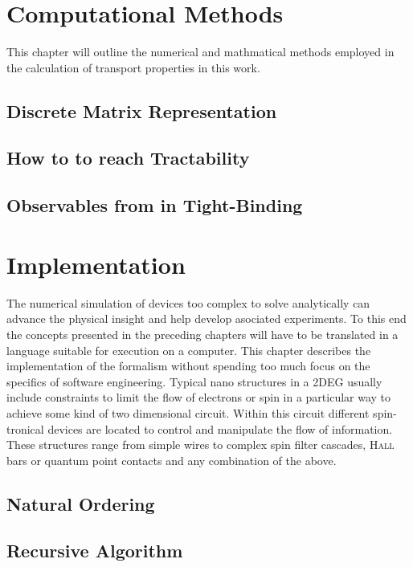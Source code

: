 \chapter{Computational Methods}
This chapter will outline the numerical and mathmatical methods employed in the calculation of transport properties in this work.
  \section{Discrete Matrix Representation}\label{sec:discretematrixrep}
  
  \section{How to to reach Tractability}\label{sec:tractability}
  
  \section{Observables from \cgfnc{} in Tight-Binding}
  
\chapter{Implementation}
The numerical simulation of devices too complex to solve analytically can advance the physical insight and help develop asociated experiments. To this end the concepts presented in the preceding chapters will have to be translated in a language suitable for execution on a computer. This chapter describes the implementation of the \gfnc{} formalism without spending too much focus on the specifics of software engineering.
Typical nano structures in a 2DEG usually include constraints to limit the flow of electrons or spin in a particular way to achieve some kind of two dimensional circuit. Within this circuit different spin-tronical devices are located to control and manipulate the flow of information. These structures range from simple wires to complex spin filter cascades, \textsc{Hall} bars or quantum point contacts and any combination of the above.
\section{Natural Ordering}

\section{Recursive \cgfnc{} Algorithm}

